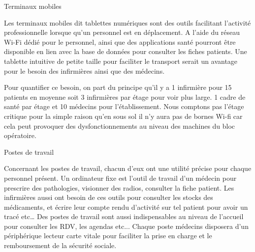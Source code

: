




Terminaux mobiles


Les terminaux mobiles dit tablettes numériques sont des outils facilitant l’activité professionnelle lorsque qu’un personnel est en déplacement. A l’aide du réseau Wi-Fi dédié pour le personnel, ainsi que des applications santé pourront être disponible en lien avec la base de données pour consulter les fiches patients.
Une tablette intuitive de petite taille pour faciliter le transport serait un avantage pour le besoin des infirmières ainsi que des médecins.


Pour quantifier ce besoin, on part du principe qu’il y a 1 infirmière pour 15 patients en moyenne soit 3 infirmières par étage pour voir plus large. 1 cadre de santé par étage et 10 médecins pour l’établissement. Nous comptons pas l’étage critique pour la simple raison qu’en sous sol il n’y aura pas de bornes Wi-fi car cela peut provoquer des dysfonctionnements au niveau des machines du bloc opératoire.










Postes de travail


Concernant les postes de travail, chacun d’eux ont une utilité précise pour chaque personnel présent.
Un ordinateur fixe est l’outil de travail d’un médecin pour prescrire des pathologies, visionner des radios, consulter la fiche patient. Les infirmières aussi ont besoin de ces outils pour consulter les stocks des médicaments, et écrire leur compte rendu d’activité sur tel patient pour avoir un tracé etc…
Des postes de travail sont aussi indispensables au niveau de l’accueil pour consulter les RDV, les agendas etc...
Chaque poste médecins disposera d’un périphérique lecteur carte vitale pour faciliter la prise en charge et le remboursement de la sécurité sociale.


